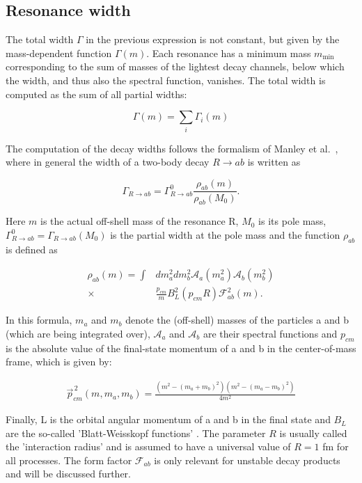 \subsection{Resonance width} \label{sec:width}

The total width $\Gamma$ in the previous expression is not constant, but given by the
mass-dependent function $\Gamma(m)$. Each resonance has a minimum mass
$m_\text{min}$ corresponding to the sum of masses of the lightest decay channels,
below which the width, and thus also the spectral function, vanishes. The total width
is computed as the sum of all partial widths:

\begin{equation}
  \Gamma(m)=\sum_i \Gamma_i(m)
\end{equation}

The computation of the decay widths follows the formalism of Manley et
al.~\cite{Manley:1992yb}, where in general the width of a two-body decay
$R\rightarrow ab$ is written as

\begin{equation} \label{eq:off_shell_width}
  \Gamma_{R\rightarrow ab} = \Gamma^0_{R\rightarrow ab} \frac{\rho_{ab}(m)}{\rho_{ab}(M_0)}.
\end{equation}

Here $m$ is the actual off-shell mass of the resonance R, $M_0$ is its pole
mass, $\Gamma^0_{R\rightarrow ab}=\Gamma_{R\rightarrow ab}(M_0)$ is the partial
width at the pole mass and the function $\rho_{ab}$ is defined as

\begin{align} \label{eq:rho_definition}
  \rho_{ab}(m) = \int & dm^2_a dm^2_b \mathcal{A}_a(m^2_a)\mathcal{A}_b(m^2_b) \nonumber \\
               \times & \frac{p_{cm}}{m} B_L^2(p_{cm}R) \mathcal{F}_{ab}^2(m).
\end{align}

In this formula, $m_a$ and $m_b$ denote the (off-shell) masses of the particles
a and b (which are being integrated over), $\mathcal{A}_a$ and $\mathcal{A}_b$
are their spectral functions and $p_{cm}$ is the absolute value of the
final-state momentum of a and b in the center-of-mass frame, which is given by:

\begin{align} \label{eq:p_cm}
  \vec{p}_{cm}^{\,2}(m,m_a,m_b) = \frac{(m^2-(m_a+m_b)^2)(m^2-(m_a-m_b)^2)}{4m^2}
\end{align}

Finally, L is the orbital angular momentum of a and b in the final state and
$B_L$ are the so-called 'Blatt-Weisskopf functions' \cite{BlaWei}. The
parameter $R$ is usually called the 'interaction radius' and is assumed to have
a universal value of $R=1$ fm for all processes. The form factor
$\mathcal{F}_{ab}$ is only relevant for unstable decay products and will be
discussed further.

